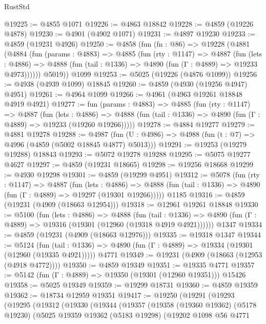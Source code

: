 \begin{lexlean}{RustStd}
\begin{coremodule}
@19225 := @4855 @1071
@19226 := @4863 @18842
@19228 := @4859 (@19226 @4878)
@19230 := @4901 (@4902 @1071)
@19231 := @4897 @19230
@19233 := @4859 (@19231 @4926)
@19250 := @4858
    (fun (fn : @86) =>
    @19228
      (@4881
        (@4884
          (fun (params : @4883) =>
          @4885
            (fun (rty : @1147) =>
            @4887
              (fun (lets : @4886) =>
              @4888 (fun (tail : @1336) => @4890 (fun (Γ : @4889) => @19233 @4973))))))
        @5019))
    @1099
@19253 := @5025 (@19226 (@4876 @1099))
@19256 := @4938 (@4939 @1099) @18845
@19260 := @4859 (@4930 (@19256 @4947) @4951)
@19261 := @4964 @1099
@19266 := @4961 (@4963 @19261 @18848 @4919 @4921)
@19277 := fun (params : @4883) =>
  @4885
    (fun (rty : @1147) =>
    @4887
      (fun (lets : @4886) =>
      @4888 (fun (tail : @1336) => @4890 (fun (Γ : @4889) => @19233 (@19260 @19266)))))
@19278 := @4884 @19277
@19279 := @4881 @19278
@19288 := @4987
    (fun (U : @4986) => @4988 (fun (t : @7) => @4996 (@4859 (@5002 @18845 @4877) @5013)))
@19291 := @19253 (@19279 @19288) @18843
@19293 := @5072 @19278 @19288
@19295 := @5075 @19277 @4627
@19297 := @4859 (@19231 @18665)
@19298 := @19256 @18668
@19299 := @4930 @19298
@19301 := @4859 (@19299 @4951)
@19312 := @5078
    (fun (rty : @1147) =>
    @4887
      (fun (lets : @4886) =>
      @4888 (fun (tail : @1336) => @4890 (fun (Γ : @4889) => @19297 (@19301 @19266)))))
    @1185
@19316 := @4859 (@19231 (@4909 (@18663 @12954)))
@19318 := @12961 @19261 @18848
@19330 := @5100
    (fun (lets : @4886) =>
    @4888
      (fun (tail : @1336) =>
      @4890 (fun (Γ : @4889) => @19316 (@19301 (@12960 (@19318 @4919 @4921))))))
    @1347
@19334 := @4859 (@19231 (@4909 (@18663 @12976)))
@19335 := @19318 @1347
@19344 := @5124
    (fun (tail : @1336) => @4890 (fun (Γ : @4889) => @19334 (@19301 (@12960 (@19335 @4921)))))
    @4771
@19349 := @19231 (@4909 (@18663 (@12953 (@4918 @4772))))
@19350 := @4859 @19349
@19351 := @19335 @4771
@19357 := @5142 (fun (Γ : @4889) => @19350 (@19301 (@12960 @19351))) @15426
@19358 := @5025 @19349
@19359 := @19299 @18731
@19360 := @4859 @19359
@19362 := @18734 @12959 @19351
@19417 := @19250
    (@19291
      (@19293
        (@19295
          (@19312
            (@19330
              (@19344
                (@19357
                  (@19358
                    (@19360 @19362)
                    (@5178 @19230)
                    (@5025
                      @19359
                      @19362
                      (@5183 @19298)
                      (@19202
                        @1098
                        @56
                        @4771

\end{coremodule}
\end{lexlean}
